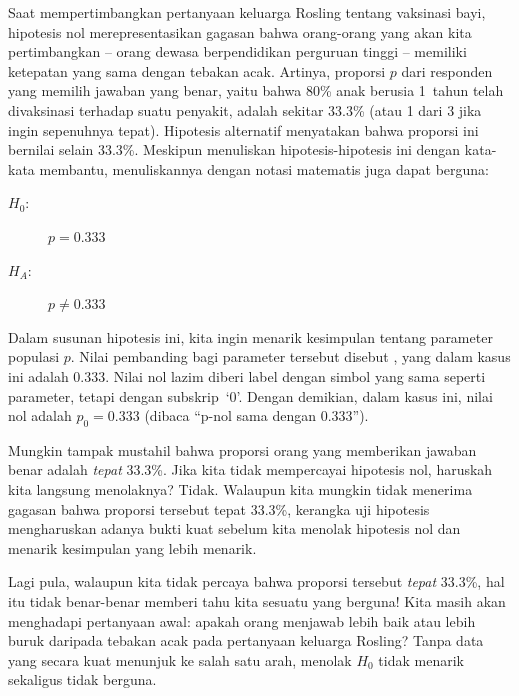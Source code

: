 Saat mempertimbangkan pertanyaan keluarga Rosling tentang vaksinasi bayi,
hipotesis nol merepresentasikan gagasan bahwa orang-orang
yang akan kita pertimbangkan -- orang dewasa berpendidikan perguruan tinggi --
memiliki ketepatan yang sama dengan tebakan acak.
Artinya, proporsi
$p$ dari responden yang memilih
jawaban yang benar, yaitu bahwa 80\% anak berusia 1~tahun telah divaksinasi
terhadap suatu penyakit, adalah sekitar 33.3\%
(atau 1 dari 3 jika ingin sepenuhnya tepat).
Hipotesis alternatif menyatakan bahwa proporsi ini bernilai
selain 33.3\%. Meskipun menuliskan hipotesis-hipotesis ini
dengan kata-kata membantu, menuliskannya dengan notasi matematis
juga dapat berguna:
\begin{description}
\item[$H_0$:] $p = 0.333$
\item[$H_A$:] $p \neq 0.333$
\end{description}
Dalam susunan hipotesis ini, kita ingin menarik kesimpulan tentang
parameter populasi $p$. Nilai pembanding bagi
parameter tersebut disebut , yang dalam
kasus ini adalah 0.333. Nilai nol lazim diberi label dengan
simbol yang sama seperti parameter, tetapi dengan subskrip~`0'.
Dengan demikian, dalam kasus ini, nilai nol adalah $p_0 = 0.333$
(dibaca ``p-nol sama dengan 0.333'').

\begin{examplewrap}
\begin{nexample}{Mungkin tampak mustahil bahwa
    proporsi orang yang memberikan jawaban benar
    adalah \emph{tepat} 33.3\%. Jika kita tidak mempercayai
    hipotesis nol, haruskah kita langsung menolaknya?}
  Tidak. Walaupun kita mungkin tidak menerima gagasan bahwa
  proporsi tersebut tepat 33.3\%, kerangka uji hipotesis
  mengharuskan adanya bukti kuat sebelum
  kita menolak hipotesis nol dan menarik kesimpulan
  yang lebih menarik.

  Lagi pula, walaupun kita tidak percaya bahwa proporsi tersebut
  \emph{tepat} 33.3\%, hal itu tidak benar-benar memberi tahu kita sesuatu
  yang berguna! Kita masih akan menghadapi pertanyaan awal:
  apakah orang menjawab lebih baik atau lebih buruk daripada tebakan acak pada
  pertanyaan keluarga Rosling?
  Tanpa data yang secara kuat
  menunjuk ke salah satu arah, menolak $H_0$
  tidak menarik sekaligus tidak berguna.
\end{nexample}
\end{examplewrap}

